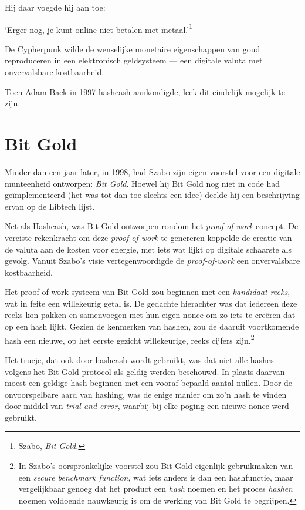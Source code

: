\documentclass[
  a5paper,
  smalldemyvopaper,11pt,twoside,onecolumn,openright,extrafontsizes,
hidelinks]{memoir}
\renewenvironment{quote}%
               {\list{}{\rightmargin=.3cm\leftmargin=.3cm}%
                \itshape \item[]}%
               {\endlist}
\begin{document}
Hij daar voegde hij aan toe:

\begin{quote}
`Erger nog, je kunt online niet betalen met metaal.'\footnote{Szabo,
  \emph{Bit Gold.}}
\end{quote}

De Cypherpunk wilde de wenselijke monetaire eigenschappen van goud
reproduceren in een elektronisch geldsysteem --- een digitale valuta met
onvervalsbare kostbaarheid.

Toen Adam Back in 1997 hashcash aankondigde, leek dit eindelijk mogelijk
te zijn.

\section{Bit Gold}\label{bit-gold-1}

Minder dan een jaar later, in 1998, had Szabo zijn eigen voorstel voor
een digitale munteenheid ontworpen: \emph{Bit Gold}. Hoewel hij Bit Gold
nog niet in code had geïmplementeerd (het was tot dan toe slechts een
idee) deelde hij een beschrijving ervan op de Libtech lijst.

Net als Hashcash, was Bit Gold ontworpen rondom het \emph{proof-of-work}
concept. De vereiste rekenkracht om deze \emph{proof-of-work} te
genereren koppelde de creatie van de valuta aan de kosten voor energie,
met iets wat lijkt op digitale schaarste als gevolg. Vanuit Szabo's
visie vertegenwoordigde de \emph{proof-of-work} een onvervalsbare
kostbaarheid.

Het proof-of-work systeem van Bit Gold zou beginnen met een
\emph{kandidaat-reeks}, wat in feite een willekeurig getal is. De
gedachte hierachter was dat iedereen deze reeks kon pakken en
samenvoegen met hun eigen nonce om zo iets te creëren dat op een hash
lijkt. Gezien de kenmerken van hashen, zou de daaruit voortkomende hash
een nieuwe, op het eerste gezicht willekeurige, reeks cijfers
zijn.\footnote{In Szabo's oorspronkelijke voorstel zou Bit Gold
  eigenlijk gebruikmaken van een \emph{secure benchmark function}, wat
  iets anders is dan een hashfunctie, maar vergelijkbaar genoeg dat het
  product een \emph{hash} noemen en het proces \emph{hashen} noemen
  voldoende nauwkeurig is om de werking van Bit Gold te begrijpen.}

Het trucje, dat ook door hashcash wordt gebruikt, was dat niet alle
hashes volgens het Bit Gold protocol als geldig werden beschouwd. In
plaats daarvan moest een geldige hash beginnen met een vooraf bepaald
aantal nullen. Door de onvoorspelbare aard van hashing, was de enige
manier om zo'n hash te vinden door middel van \emph{trial and error},
waarbij bij elke poging een nieuwe nonce werd gebruikt.
\end{document}
